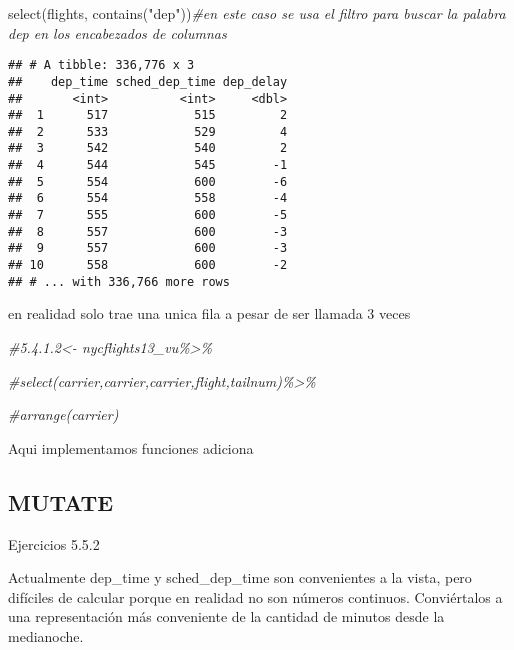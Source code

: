 \documentclass[
]{article}
\newenvironment{Shaded}{\begin{snugshade}}{\end{snugshade}}
\newcommand{\CommentTok}[1]{\textcolor[rgb]{0.56,0.35,0.01}{\textit{#1}}}
\newcommand{\FunctionTok}[1]{\textcolor[rgb]{0.00,0.00,0.00}{#1}}
\newcommand{\NormalTok}[1]{#1}
\newcommand{\StringTok}[1]{\textcolor[rgb]{0.31,0.60,0.02}{#1}}
\begin{document}
\begin{Shaded}
\begin{Highlighting}[]
\FunctionTok{select}\NormalTok{(flights, }\FunctionTok{contains}\NormalTok{(}\StringTok{"dep"}\NormalTok{))}\CommentTok{\#en este caso se usa el filtro para buscar la palabra dep en los encabezados de columnas}
\end{Highlighting}
\end{Shaded}

\begin{verbatim}
## # A tibble: 336,776 x 3
##    dep_time sched_dep_time dep_delay
##       <int>          <int>     <dbl>
##  1      517            515         2
##  2      533            529         4
##  3      542            540         2
##  4      544            545        -1
##  5      554            600        -6
##  6      554            558        -4
##  7      555            600        -5
##  8      557            600        -3
##  9      557            600        -3
## 10      558            600        -2
## # ... with 336,766 more rows
\end{verbatim}

en realidad solo trae una unica fila a pesar de ser llamada 3 veces

\begin{Shaded}
\begin{Highlighting}[]
\CommentTok{\#\textquotesingle{}5.4.1.2\textquotesingle{}\textless{}{-} nycflights13\_vu\%\textgreater{}\%}

 \CommentTok{\#select(carrier,carrier,carrier,flight,tailnum)\%\textgreater{}\%}

\CommentTok{\#arrange(carrier)}
\end{Highlighting}
\end{Shaded}

Aqui implementamos funciones adiciona

\hypertarget{mutate}{%
\subsection{MUTATE}\label{mutate}}

Ejercicios 5.5.2

Actualmente dep\_time y sched\_dep\_time son convenientes a la vista,
pero difíciles de calcular porque en realidad no son números continuos.
Conviértalos a una representación más conveniente de la cantidad de
minutos desde la medianoche.
\end{document}
